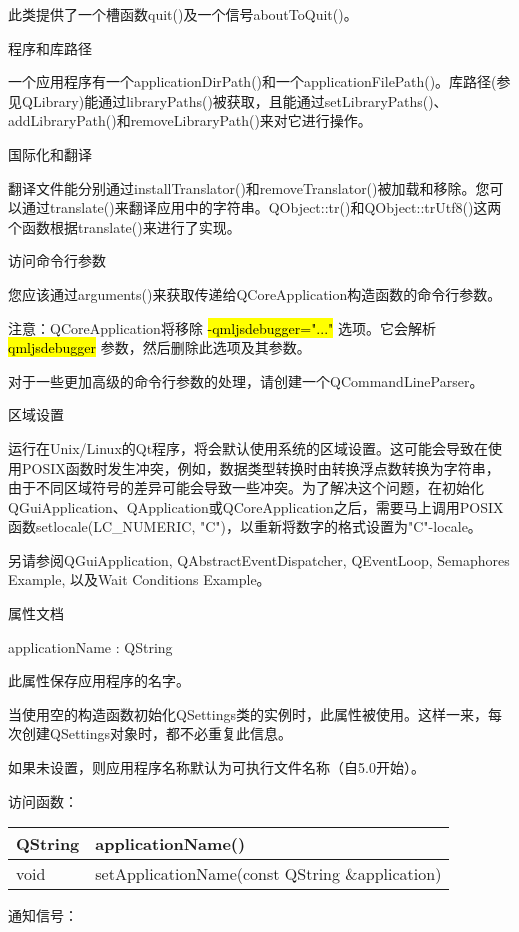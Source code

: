 此类提供了一个槽函数quit()及一个信号aboutToQuit()。

程序和库路径

一个应用程序有一个applicationDirPath()和一个applicationFilePath()。库路径(参见QLibrary)能通过libraryPaths()被获取，且能通过setLibraryPaths()、addLibraryPath()和removeLibraryPath()来对它进行操作。

国际化和翻译

翻译文件能分别通过installTranslator()和removeTranslator()被加载和移除。您可以通过translate()来翻译应用中的字符串。QObject::tr()和QObject::trUtf8()这两个函数根据translate()来进行了实现。

访问命令行参数

您应该通过arguments()来获取传递给QCoreApplication构造函数的命令行参数。

注意：QCoreApplication将移除 \hl{-qmljsdebugger="..."} 选项。它会解析
\hl{qmljsdebugger} 参数，然后删除此选项及其参数。

对于一些更加高级的命令行参数的处理，请创建一个QCommandLineParser。

区域设置

运行在Unix/Linux的Qt程序，将会默认使用系统的区域设置。这可能会导致在使用POSIX函数时发生冲突，例如，数据类型转换时由转换浮点数转换为字符串，由于不同区域符号的差异可能会导致一些冲突。为了解决这个问题，在初始化QGuiApplication、QApplication或QCoreApplication之后，需要马上调用POSIX函数setlocale(LC\_NUMERIC, "C")，以重新将数字的格式设置为"C"-locale。

另请参阅QGuiApplication, QAbstractEventDispatcher, QEventLoop, Semaphores Example, 以及Wait Conditions Example。

\splitLine

属性文档

applicationName : QString

此属性保存应用程序的名字。

当使用空的构造函数初始化QSettings类的实例时，此属性被使用。这样一来，每次创建QSettings对象时，都不必重复此信息。

如果未设置，则应用程序名称默认为可执行文件名称（自5.0开始）。

访问函数：

\begin{tabular}{|l|l|}
\hline
QString	&applicationName()\\
\hline
void	&setApplicationName(const QString \&application)\\
\hline
\end{tabular}

通知信号：

